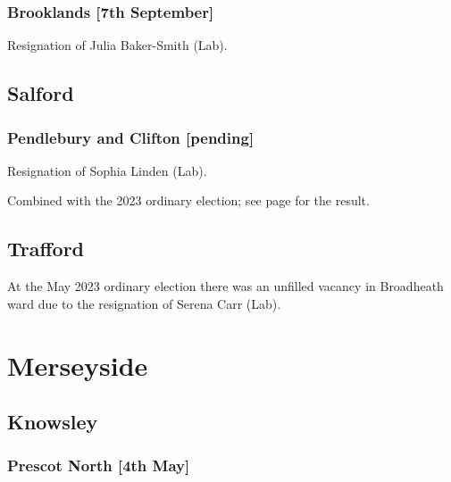 \documentclass[a4paper,openany]{book}
\begin{document}
\begin{resultsiii}
\subsubsection*{Brooklands \hspace*{\fill}\nolinebreak[1]%
	\enspace\hspace*{\fill}
	[7th September]}


Resignation of Julia Baker-Smith (Lab).

\subsection*{Salford}

\subsubsection*{Pendlebury and Clifton \hspace*{\fill}\nolinebreak[1]%
	\enspace\hspace*{\fill}
	[pending]}


Resignation of Sophia Linden (Lab).

Combined with the 2023 ordinary election; see page \pageref{PendleburyCliftonSalford} for the result.

\subsection*{Trafford}

At the May 2023 ordinary election there was an unfilled vacancy in Broadheath ward due to the resignation of Serena Carr (Lab).%

\section{Merseyside}

\subsection*{Knowsley}

\subsubsection*{Prescot North \hspace*{\fill}\nolinebreak[1]%
	\enspace\hspace*{\fill}
	[4th May]}


\end{resultsiii}
\end{document}
